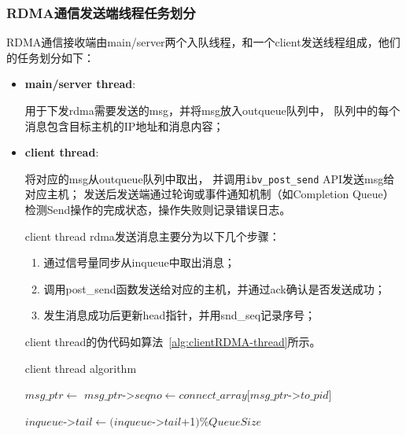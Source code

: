 {    \subsubsection{RDMA通信发送端线程任务划分}
    RDMA通信接收端由main/server两个入队线程，和一个client发送线程组成，他们的任务划分如下：

    \begin{itemize}
        \item \textbf{main/server thread}:

              用于下发rdma需要发送的msg，并将msg放入outqueue队列中，
              队列中的每个消息包含目标主机的IP地址和消息内容；
        \item \textbf{client thread}:

              将对应的msg从outqueue队列中取出，
              并调用\texttt{ibv\_post\_send} API发送msg给对应主机；
              发送后发送端通过轮询或事件通知机制（如Completion Queue）检测Send操作的完成状态，操作失败则记录错误日志。

              client thread rdma发送消息主要分为以下几个步骤：
              \begin{enumerate}[leftmargin=*, nosep]
                  \item 通过信号量同步从inqueue中取出消息；
                  \item 调用post\_send函数发送给对应的主机，并通过ack确认是否发送成功；
                  \item 发生消息成功后更新head指针，并用snd\_seq记录序号；
              \end{enumerate}

              \newpage
              client thread的伪代码如算法~\ref{alg:clientRDMA-thread}所示。
              \begin{algorithm}
                  \caption{client thread algorithm}\label{alg:clientRDMA-thread}
                  \begin{algorithmic}[1] %
                      \State {}
                      \State $msg\_ptr \gets$ 
                      \State $msg\_ptr$->$seqno \gets connect\_array[msg\_ptr$->$to\_pid]$

                      \State
                      \State {}
                      \State {}
                      \State {}
                      \State $inqueue$->$tail \gets (inqueue$->$tail$+1$) \%QueueSize$
                      \Else
                      \EndWhile
                      \EndIf


\end{algorithmic}
\end{algorithm}
\end{itemize}}
